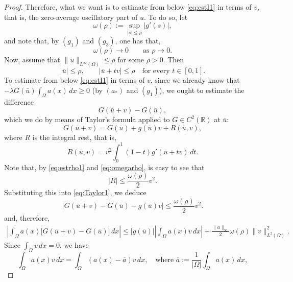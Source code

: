 \documentclass[11pt,reqno]{amsart}
\theoremstyle{plain}
\theoremstyle{definition}
\numberwithin{equation}{section}
\newcommand{\R}{\mathbb{R}}
\begin{document}
\begin{proof}
    Therefore, what we want is to estimate from below \eqref{eq:estI1} in terms of $v$, that is, the zero-average oscillatory part of $u$. To do so, let
    \begin{equation} \label{eq:omegarho}
        \omega(\rho):=
        \sup_{|s|\leq\rho}|g'(s)|,
    \end{equation}
    and note that, by $(g_1)$ and $(g_3)$, one has that,
    \begin{equation}\label{eq:omega}
        \omega(\rho)\rightarrow0
        \qquad\text{as }\rho\to0.
    \end{equation}
    Now, assume that $\|u\|_{L^\infty(\Omega)}\leq\rho$ for some $\rho>0$. Then
    \begin{equation} \label{eq:estrho1}
        |\bar u|\leq\rho,
        \qquad
        |\bar u+tv|\leq\rho
        \quad\text{for every }t\in[0,1].
    \end{equation}
    To estimate from below \eqref{eq:estI1} in terms of $v$, since we already know that $-\lambda G(\bar u ) \int_\Omega a(x) \,dx \geq 0$ (by $(a_\ast)$ and $(g_1)$), we ought to estimate the difference
    $$G(\bar u +v) - G(\bar u),$$
    which we do by means of Taylor's formula applied to $G\in C^2(\R)$ at $\bar u$:
    \begin{equation} \label{eq:Taylor1}
        G(\bar u+v)
        =
        G(\bar u)+g(\bar u)v+R(\bar u, v),
    \end{equation}
    where $R$ is the integral rest, that is,
    $$
        R(\bar u, v)
        =
        v^2\int_0^1(1-t)
        g'(\bar u+tv)\,dt.
    $$
    Note that, by \eqref{eq:estrho1} and \eqref{eq:omegarho}, is easy to see that
    $$
        |R|
        \leq
        \frac{\omega(\rho)}{2}v^2.
    $$
    Substituting this into \eqref{eq:Taylor1}, we deduce
    \begin{equation}\label{eq:Taylor}
        \left|
        G(\bar u+v)-G(\bar u)-g(\bar u)v
        \right|
        \leq
        \frac{\omega(\rho)}{2}v^2.
    \end{equation}
    and, therefore, 
    $$
    \begin{aligned}
        \left|
        \int_\Omega
        a(x)\big[G(\bar u+v)-G(\bar u)\big]\,dx
        \right|
        \leq
        |g(\bar u)|
        \left|\int_\Omega a(x)v\,dx\right|
        +
        \frac{\|a\|_\infty}{2}
        \omega(\rho)\|v\|_{L^2(\Omega)}^2.
    \end{aligned}
    $$
    Since $\int_\Omega v\,dx=0$, we have
    $$
        \int_\Omega a(x)v\,dx
        =
        \int_\Omega (a(x)-\bar a)v\,dx, \quad \text{where } \bar a := \frac{1}{|\Omega|}\int_\Omega a(x) \, dx, 
$$
\end{proof}
\end{document}
